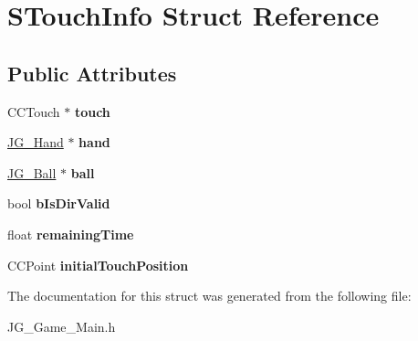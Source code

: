 \hypertarget{struct_s_touch_info}{\section{S\-Touch\-Info Struct Reference}
\label{struct_s_touch_info}
}
\subsection*{Public Attributes}
\begin{DoxyCompactItemize}
\item 
\hypertarget{struct_s_touch_info_a476c6db5c7f5ee0987fef6221fbceaf7}{C\-C\-Touch $\ast$ {\bfseries touch}}\label{struct_s_touch_info_a476c6db5c7f5ee0987fef6221fbceaf7}

\item 
\hypertarget{struct_s_touch_info_a354b68630606341541b282561bb4c292}{\hyperlink{class_j_g___hand}{J\-G\-\_\-\-Hand} $\ast$ {\bfseries hand}}\label{struct_s_touch_info_a354b68630606341541b282561bb4c292}

\item 
\hypertarget{struct_s_touch_info_aaed3c79798657884c11efa8a0e1fcb3f}{\hyperlink{class_j_g___ball}{J\-G\-\_\-\-Ball} $\ast$ {\bfseries ball}}\label{struct_s_touch_info_aaed3c79798657884c11efa8a0e1fcb3f}

\item 
\hypertarget{struct_s_touch_info_ab444619d360b1742837805506f9e1779}{bool {\bfseries b\-Is\-Dir\-Valid}}\label{struct_s_touch_info_ab444619d360b1742837805506f9e1779}

\item 
\hypertarget{struct_s_touch_info_a76f5cc268d81a4d3c80884669c7cc050}{float {\bfseries remaining\-Time}}\label{struct_s_touch_info_a76f5cc268d81a4d3c80884669c7cc050}

\item 
\hypertarget{struct_s_touch_info_a2d02a4f172677f2a3f90d6ad98ba75cd}{C\-C\-Point {\bfseries initial\-Touch\-Position}}\label{struct_s_touch_info_a2d02a4f172677f2a3f90d6ad98ba75cd}

\end{DoxyCompactItemize}


The documentation for this struct was generated from the following file\-:\begin{DoxyCompactItemize}
\item 
J\-G\-\_\-\-Game\-\_\-\-Main.\-h\end{DoxyCompactItemize}
